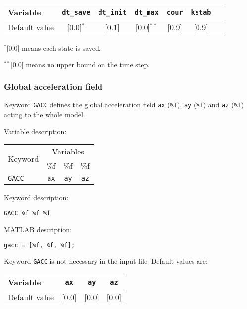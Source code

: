 \begin{tabular}{|l|c|c|c|c|c|c|}
\hline
Variable & \texttt{dt\_save} & \texttt{dt\_init} & \texttt{dt\_max} & \texttt{cour} & \texttt{kstab} \\ \hline
Default value & [0.0]$^*$ & [0.1] & [0.0]$^{**}$ & [0.9] & [0.9] \\ \hline
\end{tabular}

$^*$[0.0] means each state is saved.

$^{**}$[0.0] means no upper bound on the time step.

\newpage


\subsubsection{Global acceleration field}

Keyword \texttt{GACC} defines the global acceleration field \texttt{ax} (\texttt{\%f}), \texttt{ay} (\texttt{\%f}) and \texttt{az} (\texttt{\%f}) acting to the whole model.

Variable description:

\begin{tabular}{|l|c|c|c|}
\hline
\multirow{2}{*}{Keyword} & \multicolumn{3}{c|}{Variables} \\ \cline{2-4}
& \%f & \%f & \%f \\ \hline
\texttt{GACC} & \texttt{ax} & \texttt{ay} & \texttt{az} \\ \hline
\end{tabular}

Keyword description:

\begin{tcolorbox}
\texttt{GACC \%f \%f \%f}
\end{tcolorbox}

MATLAB description:

\begin{tcolorbox}
\texttt{gacc = [\%f, \%f, \%f];}
\end{tcolorbox}

Keyword \texttt{GACC} is not necessary in the input file. Default values are:

\begin{tabular}{|l|c|c|c|}
\hline
Variable & \texttt{ax} & \texttt{ay} & \texttt{az} \\ \hline
Default value & [0.0] & [0.0] & [0.0] \\ \hline
\end{tabular}

